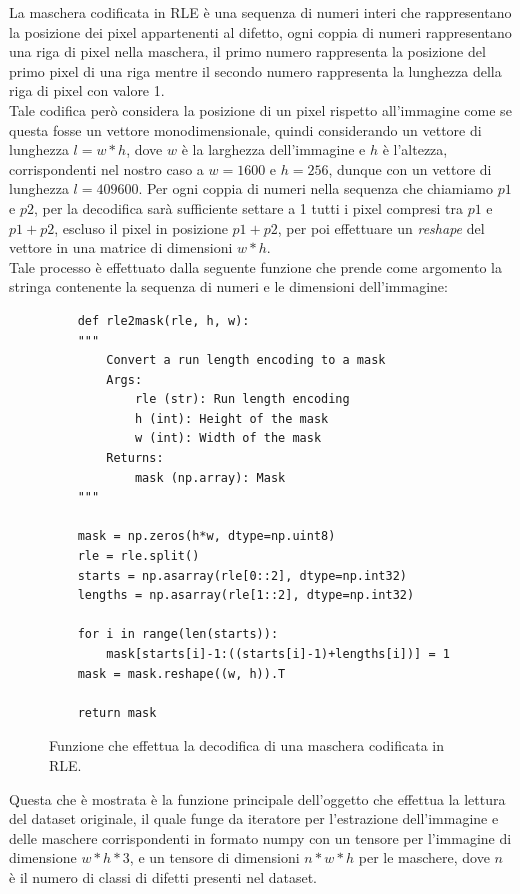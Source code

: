 La maschera codificata in RLE è una sequenza di numeri interi che rappresentano la posizione dei pixel appartenenti al difetto,
ogni coppia di numeri rappresentano una riga di pixel nella maschera, il primo numero rappresenta la posizione del primo pixel
di una riga mentre il secondo numero rappresenta la lunghezza della riga di pixel con valore 1.\\
Tale codifica però considera la posizione di un pixel rispetto all'immagine come se questa fosse un vettore monodimensionale,
quindi considerando un vettore di lunghezza $l = w * h$, dove $w$ è la larghezza dell'immagine e $h$ è l'altezza, corrispondenti nel nostro caso
a $w = 1600$ e $h = 256$, dunque con un vettore di lunghezza $l = 409600$. Per ogni coppia di numeri nella sequenza che chiamiamo $p1$ e $p2$,
per la decodifica sarà sufficiente settare a 1 tutti i pixel compresi tra $p1$ e $p1 + p2$, escluso il pixel in posizione $p1 + p2$,
per poi effettuare un \textit{reshape} del vettore in una matrice di dimensioni $w * h$.\\
Tale processo è effettuato dalla seguente funzione che prende come argomento la stringa contenente la sequenza di numeri e le dimensioni dell'immagine:

\begin{figure}[H]
    \begin{verbatim}
    def rle2mask(rle, h, w):
    """
        Convert a run length encoding to a mask
        Args:
            rle (str): Run length encoding
            h (int): Height of the mask
            w (int): Width of the mask
        Returns:
            mask (np.array): Mask
    """

    mask = np.zeros(h*w, dtype=np.uint8)
    rle = rle.split()
    starts = np.asarray(rle[0::2], dtype=np.int32)
    lengths = np.asarray(rle[1::2], dtype=np.int32)

    for i in range(len(starts)):
        mask[starts[i]-1:((starts[i]-1)+lengths[i])] = 1
    mask = mask.reshape((w, h)).T

    return mask
    \end{verbatim}
    \caption{Funzione che effettua la decodifica di una maschera codificata in RLE.}
\end{figure}

Questa che è mostrata è la funzione principale dell'oggetto che effettua la lettura del dataset originale, il quale funge da iteratore 
per l'estrazione dell'immagine e delle maschere corrispondenti in formato numpy con un tensore per l'immagine di dimensione $w * h * 3$, 
e un tensore di dimensioni $n * w * h$ per le maschere, dove $n$ è il numero di classi di difetti presenti nel dataset.


